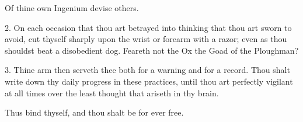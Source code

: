 Of thine own Ingenium devise others.

2. On each occasion that thou art betrayed into thinking that thou art sworn to avoid, cut thyself sharply upon the wrist or forearm with a razor; even as thou shouldst beat a disobedient dog. Feareth not the Ox the Goad of the Ploughman?

3. Thine arm then serveth thee both for a warning and for a record. Thou shalt write down thy daily progress in these practices, until thou art perfectly vigilant at all times over the least thought that ariseth in thy brain.

Thus bind thyself, and thou shalt be for ever free.
